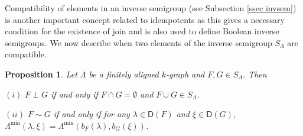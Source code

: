\documentclass[a4paper,reqno,11pt]{amsart}
\numberwithin{equation}{section}
\newtheorem{prop}[thm]{Proposition}
\theoremstyle{definition}
\theoremstyle{remark}
\begin{document}
Compatibility of elements in an inverse semigroup (see Subsection \ref{ssec invsem}) is another important concept related to idempotents as this gives a necessary condition for the existence of join and is also used to define Boolean inverse semigroups. We now describe when two elements of the inverse semigroup $S_\Lambda$ are compatible. 
\begin{prop}\label{pro describing compatibility}
Let $\Lambda$ be a finitely aligned $k$-graph and $F,G\in S_\Lambda$. Then

$(i)$ $F\perp G$ if and only if $F\cap G=\emptyset$ and $F\cup G\in S_\Lambda$. 

$(ii)$ $F\sim G$ if and only if for any $\lambda\in \mathsf{D}(F)$ and $\xi\in \mathsf{D}(G)$, $\Lambda^{\min}(\lambda,\xi)=\Lambda^{\min}(b_F(\lambda),b_G(\xi))$.   
\end{prop}
\end{document}
